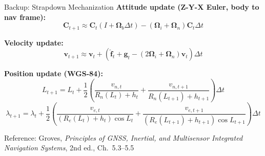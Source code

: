 \documentclass[aspectratio=169]{beamer}
\begin{document}
\begin{frame}{Backup: Strapdown Mechanization}
    \textbf{Attitude update (Z-Y-X Euler, body to nav frame):}
    \[
    \mathbf{C}_{t+1} \approx \mathbf{C}_t \left( I + \boldsymbol{\Omega}_{b} \Delta t \right) - \left( \boldsymbol{\Omega}_{i} + \boldsymbol{\Omega}_{n} \right) \mathbf{C}_t \Delta t
    \]

    \textbf{Velocity update:}
    \[
    \mathbf{v}_{t+1} \approx \mathbf{v}_{t} + \left( \hat{\mathbf{f}}_{t} + \mathbf{g}_t - \left( 2\boldsymbol{\Omega}_{i} + \boldsymbol{\Omega}_{n} \right) \mathbf{v}_t \right) \Delta t
    \]

    \textbf{Position update (WGS-84):}
    \[
    L_{t+1} = L_{t} + \frac{1}{2} \left( \frac{v_{n,t}}{R_n(L_t)+h_t} + \frac{v_{n,t+1}}{R_n(L_{t+1})+h_{t+1}} \right) \Delta t
    \]
    \[
    \lambda_{t+1} = \lambda_t + \frac{1}{2}\left(\frac{v_{e,t}}{(R_e(L_t)+h_t)\cos L_t} + \frac{v_{e,t+1}}{(R_e(L_{t+1})+h_{t+1})\cos L_{t+1}}\right)\Delta t
    \]

    Reference: Groves, \emph{Principles of GNSS, Inertial, and Multisensor Integrated Navigation Systems}, 2nd ed., Ch.\ 5.3--5.5
\end{frame}
\end{document}
